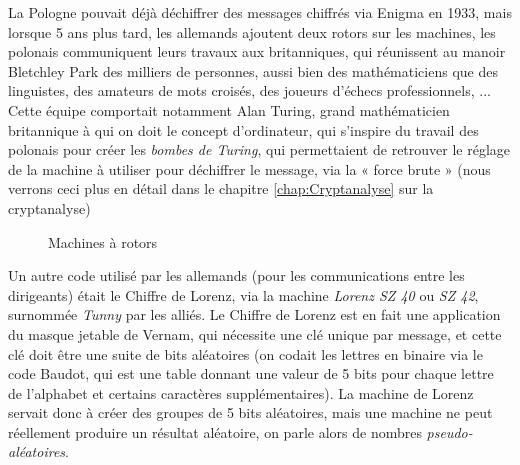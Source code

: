 La Pologne pouvait déjà déchiffrer des messages chiffrés via Enigma en
1933, mais lorsque 5 ans plus tard, les allemands ajoutent deux rotors
sur les machines, les polonais communiquent leurs travaux aux
britanniques, qui réunissent au manoir Bletchley Park des milliers de
personnes, aussi bien des mathématiciens que des linguistes, des
amateurs de mots croisés, des joueurs d'échecs professionnels, ...
Cette équipe comportait notamment Alan Turing, grand mathématicien
britannique à qui on doit le concept d'ordinateur, qui s'inspire du
travail des polonais pour créer les \emph{bombes de Turing}, qui
permettaient de retrouver le réglage de la machine à utiliser pour
déchiffrer le message, via la « force brute » (nous verrons ceci plus
en détail dans le chapitre \ref{chap:Cryptanalyse} sur la
cryptanalyse) \\

\begin{figure}[h]
  \begin{center}
    \hspace{1.5cm}
  \end{center}
  \vspace{-10pt}
  \caption{Machines à rotors}
  \vspace{-10pt}
\end{figure}


Un autre code utilisé par les allemands (pour les communications entre
les dirigeants) était le Chiffre de Lorenz, via la machine
\emph{Lorenz SZ 40} ou \emph{SZ 42}, surnommée \emph{Tunny} par les alliés. Le
Chiffre de Lorenz est en fait une application du masque jetable de
Vernam, qui nécessite une clé unique par message, et cette clé doit
être une suite de bits aléatoires (on codait les lettres en binaire
via le code Baudot, qui est une table donnant une valeur de 5 bits
pour chaque lettre de l'alphabet et certains caractères
supplémentaires). La machine de Lorenz servait donc à créer des
groupes de 5 bits aléatoires, mais une machine ne peut réellement
produire un résultat aléatoire, on parle alors de nombres
\emph{pseudo-aléatoires}.

